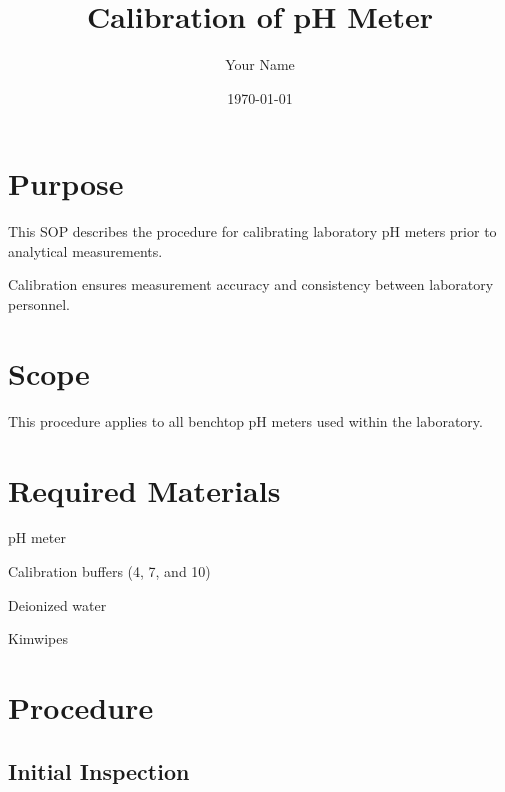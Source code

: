 \documentclass{SOP5}\usepackage[]{graphicx}\usepackage[]{xcolor}
\title{Calibration of pH Meter}
\author{Your Name}
\date{\today}
\begin{document}
\maketitle

\tableofcontents

\newpage

\section{Purpose}

\NP
This SOP describes the procedure for calibrating laboratory pH meters prior to analytical measurements.

\NP
Calibration ensures measurement accuracy and consistency between laboratory personnel.

\section{Scope}

\NP
This procedure applies to all benchtop pH meters used within the laboratory.

\section{Required Materials}

\begin{itemize*}
    \item pH meter
    \item Calibration buffers (4, 7, and 10)
    \item Deionized water
    \item Kimwipes
\end{itemize*}

\section{Procedure}

\subsection{Initial Inspection}
\end{document}
